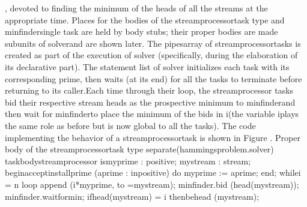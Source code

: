 \tyxffmxendmono[], devoted to finding the minimum of the heads of
all the streams at the appropriate time. Places for the bodies of
the \tyxffmxmono[]stream\Symuns[]processor\tyxffmxendmono[] task type
and \tyxffmxmono[]min\Symuns[]finder\tyxffmxendmono[] single task
are held by body stubs; their proper bodies are made subunits of %
\tyxffmxmono[]solver\tyxffmxendmono[] and are shown later.%
\Endpara[]
\Para[]The \tyxffmxmono[]pipes\tyxffmxendmono[] array of %
\tyxffmxmono[]stream\Symuns[]processor\tyxffmxendmono[] tasks is created
as part of the execution of \tyxffmxmono[]solver%
\tyxffmxendmono[] (specifically, during the elaboration of its declarative
part). The statement list of \tyxffmxmono[]solver%
\tyxffmxendmono[] initializes each task with its corresponding prime,
then waits (at its end) for all the tasks to terminate before returning
to its caller.\Endpara[]
\Para[]Each time through their loop, the \tyxffmxmono[]stream\Symuns[]processor%
\tyxffmxendmono[] tasks bid their respective stream heads as the prospective
minimum to \tyxffmxmono[]min\Symuns[]finder\tyxffmxendmono[] and then
wait for \tyxffmxmono[]min\Symuns[]finder\tyxffmxendmono[] to place
the minimum of the bids in \tyxffmxmono[]i\tyxffmxendmono[] (the variable
\tyxffmxmono[]i\tyxffmxendmono[] plays the same role as before but
is now global to all the tasks). The code implementing the behavior
of a \tyxffmxmono[]stream\Symuns[]processor\tyxffmxendmono[] task
is shown in Figure .
\Parbox[]
Proper body of the %
\tyxffmxmono[]stream\Symuns[]processor\tyxffmxendmono[] task type%
\FgEndcap[]
\Comp[]\tyxtstxbf[]separate\tyxtstxendbf[] (hammings\Symuns[]problem.solver)
\tyxtstxbf[]task\tyxtstxendbf[] \tyxtstxbf[]body\tyxtstxendbf[] stream\Symuns[]processor %
\tyxtstxbf[]is\tyxtstxendbf[]
   my\Symuns[]prime  : positive;
   my\Symuns[]stream : stream;
\tyxtstxbf[]begin\tyxtstxendbf[]
   \tyxtstxbf[]accept\tyxtstxendbf[] install\Symuns[]prime (a\Symuns[]prime : %
\tyxtstxbf[]in\tyxtstxendbf[] positive) \tyxtstxbf[]do%
\tyxtstxendbf[]
      my\Symuns[]prime := a\Symuns[]prime;
   \tyxtstxbf[]end\tyxtstxendbf[];
   \tyxtstxbf[]while\tyxtstxendbf[] i \Symlt[]= n \tyxtstxbf[]loop%
\tyxtstxendbf[]
      append (i*my\Symuns[]prime, to =\Symgt[] my\Symuns[]stream);
      min\Symuns[]finder.bid (head(my\Symuns[]stream));
      min\Symuns[]finder.wait\Symuns[]for\Symuns[]min;
      \tyxtstxbf[]if\tyxtstxendbf[] head(my\Symuns[]stream) = i %
\tyxtstxbf[]then\tyxtstxendbf[]
         behead (my\Symuns[]stream);
